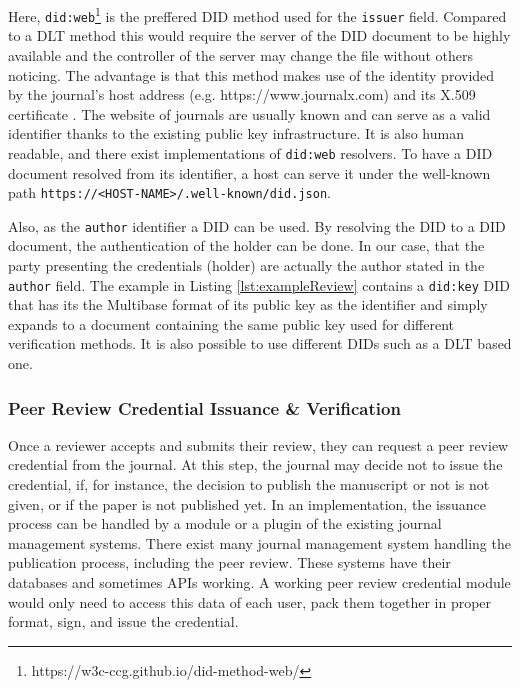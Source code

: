 Here, \lstinline{did:web}\footnote{https://w3c-ccg.github.io/did-method-web/} is the preffered \acrshort{DID} method used for the \lstinline{issuer} field. Compared to a \acrshort{DLT} method this would require the server of the \acrshort{DID} document to be highly available and the controller of the server may change the file without others noticing. The advantage is that this method makes use of the identity provided by the journal's host address (e.g. https://www.journalx.com) and its X.509 certificate \parencite{Barclay.6Nis2020}. The website of journals are usually known and can serve as a valid identifier thanks to the existing public key infrastructure. It is also human readable, and there exist implementations of \lstinline{did:web} resolvers. To have a \acrshort{DID} document resolved from its identifier, a host can serve it under the well-known path \parencite{rfc5785} \lstinline{https://<HOST-NAME>/.well-known/did.json}. 

Also, as the \lstinline{author} identifier a \acrshort{DID} can be used. By resolving the \acrshort{DID} to a \acrshort{DID} document, the authentication of the holder can be done. In our case, that the party presenting the credentials (holder) are actually the author stated in the \lstinline{author} field. The example in Listing \ref{lst:exampleReview} contains a \lstinline{did:key} \parencite{did-key} \acrshort{DID} that has its the Multibase format \parencite{multiformats-multibase-03} of its public key as the identifier and simply expands to a document containing the same public key used for different verification methods. It is also possible to use different \acrshort{DID}s such as a \acrshort{DLT} based one.



\subsubsection{Peer Review Credential Issuance \& Verification}

Once a reviewer accepts and submits their review, they can request a peer review credential from the journal. At this step, the journal may decide not to issue the credential, if, for instance, the decision to publish the manuscript or not is not given, or if the paper is not published yet. In an implementation, the issuance process can be handled by a module or a plugin of the existing journal management systems. There exist many journal management system handling the publication process, including the peer review. These systems have their databases and sometimes \acrshort{API}s working. A working peer review credential module would only need to access this data of each user, pack them together in proper format, sign, and issue the credential. 

